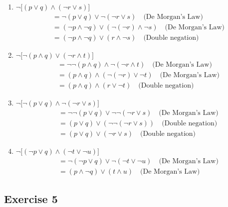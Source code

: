 \documentclass[11pt]{article}
\begin{document}
    \begin{enumerate}
        \item
        $\neg \big[ (p \vee q) \wedge (\neg r \vee s) \big]$
        \begin{align*}
            &= \neg (p \vee q) \vee \neg (\neg r \vee s) \quad\text{(De Morgan's Law)} \\
            &= (\neg p \wedge \neg q) \vee (\neg (\neg r) \wedge \neg s) \quad\text{(De Morgan's Law)} \\
            &= (\neg p \wedge \neg q) \vee (r \wedge \neg s) \quad\text{(Double negation)}
        \end{align*}

        \item
        $\neg \big[ \neg(p \wedge q) \vee (\neg r \wedge t) \big]$
        \begin{align*}
            &= \neg \neg(p \wedge q) \wedge \neg (\neg r \wedge t) \quad\text{(De Morgan's Law)} \\
            &= (p \wedge q) \wedge (\neg (\neg r) \vee \neg t) \quad\text{(De Morgan's Law)} \\
            &= (p \wedge q) \wedge (r \vee \neg t) \quad\text{(Double negation)}
        \end{align*}

        \item
        $\neg \big[ \neg(p \vee q) \wedge \neg(\neg r \vee s) \big]$
        \begin{align*}
            &= \neg \neg(p \vee q) \vee \neg \neg(\neg r \vee s) \quad\text{(De Morgan's Law)} \\
            &= (p \vee q) \vee (\neg \neg(\neg r \vee s)) \quad\text{(Double negation)} \\
            &= (p \vee q) \vee (\neg r \vee s) \quad\text{(Double negation)}
        \end{align*}

        \item
        $\neg \big[ (\neg p \vee q) \wedge (\neg t \vee \neg u) \big]$
        \begin{align*}
            &= \neg (\neg p \vee q) \vee \neg (\neg t \vee \neg u) \quad\text{(De Morgan's Law)} \\
            &= (p \wedge \neg q) \vee (t \wedge u) \quad\text{(De Morgan's Law)}
        \end{align*}
    \end{enumerate}

    \subsection*{Exercise 5}
\end{document}
